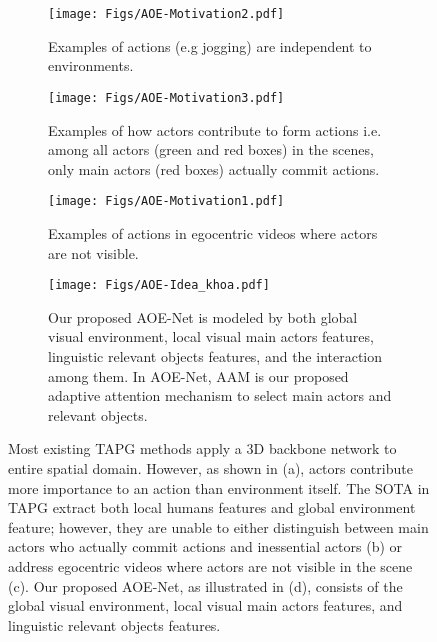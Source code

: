 \documentclass[sn-mathphys]{sn-jnl}
\theoremstyle{thmstyleone}\newtheorem{theorem}{Theorem}\newtheorem{proposition}[theorem]{Proposition}
\theoremstyle{thmstyletwo}\newtheorem{example}{Example}\newtheorem{remark}{Remark}
\theoremstyle{thmstylethree}\newtheorem{definition}{Definition}
\begin{document}
\label{sec:intro}
\begin{figure}
     \centering
     \begin{subfigure}[b]{0.95\textwidth}
         \centering
         \texttt{[image: Figs/AOE-Motivation2.pdf]}
         \caption{Examples of actions (e.g jogging) are independent to environments.}
         \label{fig:motivation1}
     \end{subfigure}
     \hfill
     \begin{subfigure}[b]{0.95\textwidth}
         \centering
         \texttt{[image: Figs/AOE-Motivation3.pdf]}
         \caption{Examples of how actors contribute to form actions i.e. among all actors (green and red boxes) in the scenes, only main actors (red boxes) actually commit actions.}
         \label{fig:motivation2}
     \end{subfigure}
     \hfill
     \begin{subfigure}[b]{0.95\textwidth}
         \centering
         \texttt{[image: Figs/AOE-Motivation1.pdf]}
         \caption{Examples of actions in egocentric videos where actors are not visible.}
         \label{fig:motivation3}
     \end{subfigure}
     \hfill
     \begin{subfigure}[b]{0.95\textwidth}
         \centering
         \texttt{[image: Figs/AOE-Idea\_khoa.pdf]}
         \caption{Our proposed AOE-Net is modeled by both global visual environment, local visual main actors features, linguistic relevant objects features, and the interaction among them. In AOE-Net, AAM is our proposed adaptive attention mechanism to select main actors and relevant objects.}
         \label{fig:ourAOE}
     \end{subfigure}
        \caption{Most existing TAPG methods \cite{lin2018bsn, BSN++, bmn, dbg, xu2020gtad} apply a 3D backbone network to entire spatial domain. However, as shown in (a), actors contribute more importance to an action than environment itself. The SOTA in TAPG \cite{KhoaVo_Access, KhoaVo_ICASSP} extract both local humans features and global environment feature; however, they are unable to either distinguish between main actors who actually commit actions and inessential actors (b) or address egocentric videos where actors are not visible in the scene (c). Our proposed AOE-Net, as illustrated in (d), consists of the global visual environment, local visual main actors features, and linguistic relevant objects features.}
        \label{fig:motivation}
\end{figure}
\end{document}
